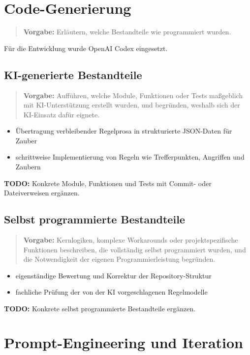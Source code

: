 \documentclass[
  12pt,
  a4paper,
  oneside,
  parskip=half,
  headings=normal
]{scrreprt}
\newcommand{\vorgabe}[1]{%
  \begin{quote}
    \small\color{hinweisfarbe}\textbf{Vorgabe:} #1
  \end{quote}
}
\newcommand{\todo}[1]{%
  \par\noindent\textcolor{red!70!black}{\textbf{TODO:} #1}\par
}
\begin{document}
\section{Code-Generierung}

\vorgabe{Erläutern, welche Bestandteile wie programmiert wurden.}

Für die Entwicklung wurde OpenAI Codex eingesetzt.

\subsection{KI-generierte Bestandteile}

\vorgabe{Aufführen, welche Module, Funktionen oder Tests maßgeblich mit
KI-Unterstützung erstellt wurden, und begründen, weshalb sich der KI-Einsatz
dafür eignete.}

\begin{itemize}
  \item Übertragung verbleibender Regelprosa in strukturierte JSON-Daten für
        Zauber
  \item schrittweise Implementierung von Regeln wie Trefferpunkten, Angriffen
        und Zaubern
\end{itemize}

\todo{Konkrete Module, Funktionen und Tests mit Commit- oder Dateiverweisen
ergänzen.}

\subsection{Selbst programmierte Bestandteile}

\vorgabe{Kernlogiken, komplexe Workarounds oder projektspezifische Funktionen
beschreiben, die vollständig selbst programmiert wurden, und die Notwendigkeit
der eigenen Programmierleistung begründen.}

\begin{itemize}
  \item eigenständige Bewertung und Korrektur der Repository-Struktur
  \item fachliche Prüfung der von der KI vorgeschlagenen Regelmodelle
\end{itemize}

\todo{Konkrete selbst programmierte Bestandteile ergänzen.}

\section{Prompt-Engineering und Iteration}
\end{document}
